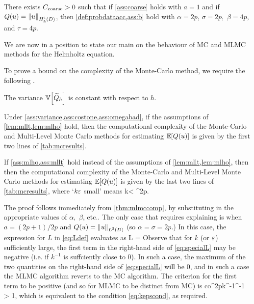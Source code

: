 \bas[Assumptions for $Q(u) = \NLtD{u}$ with $a=1$]\label{ass:mllt}
There exists $C_{\mathrm{coarse}}>0$ such that if \cref{ass:coarse} holds with $a = 1$ and if $Q(u) = \NHokD{u}$, then \cref{def:probdataacc,ass:b} hold with $\alpha = 2p$, $\sigma = 2p,$ $\beta = 4p$, and $\tau = 4p$.
\eas

We are now in a position to state our main  on the behaviour of MC and MLMC methods for the Helmholtz equation.

To prove a bound on the complexity of the Monte-Carlo method, we require the following .

\label{ass:variance}
The variance $\VAR{\Qhtilde}$ is constant with respect to $h$.
\eas

\label{thm:mcmlmchelmholtz}
Under \cref{ass:variance,ass:costone,ass:omegabad}, if the assumptions of \cref{lem:mllt,lem:mlho} hold, then the computational complexity of the Monte-Carlo and Multi-Level Monte Carlo methods for estimating $\EXP{Q(u)}$ is given by the first two lines of \cref{tab:mcresults}.

If \cref{ass:mlho,ass:mllt} hold instead of the assumptions of \cref{lem:mllt,lem:mlho}, then then the computational complexity of the Monte-Carlo and Multi-Level Monte Carlo methods for estimating $\EXP{Q(u)}$ is given by the last two lines of \cref{tab:mcresults}, where `$k\varepsilon$ small' means
\beq\label{eq:kepscond}
k\eps < \co \Ccoarse^{2p}.
\eeq
\enth

The proof follows immediately from \cref{thm:mlmccomp}, by substituting in the appropriate values of $\alpha,$ $\beta$, etc.. The only case that requires explaining is when $a=(2p+1)/2p$ and $Q(u) = \NLtD{u}$ (so $\alpha = \sigma = 2p.$) In this case, the expression for $L$ in \cref{eq:Ldef} evaluates as
\beq\label{eq:specialL}
L = \max{}
\eeq
Observe that for $k$ (or $\varepsilon$) sufficiently large, the first term in the right-hand side of \cref{eq:specialL} may be negative (i.e. if $k^{-1}$ is suffciently close to 0). In such a case, the maximum of the two quantities on the right-hand side of \cref{eq:specialL} will be 0, and in such a case the MLMC algorithm reverts to the MC algorithm. The criterion for the first term to be positive (and so for MLMC to be distinct from MC) is
\beqs
{}co\Ccoarse^{2p}k^{-1}\eps^{-1} > 1,
\eeqs
which is equivalent to the condition \cref{eq:kepscond}, as required.
\epf
{}
